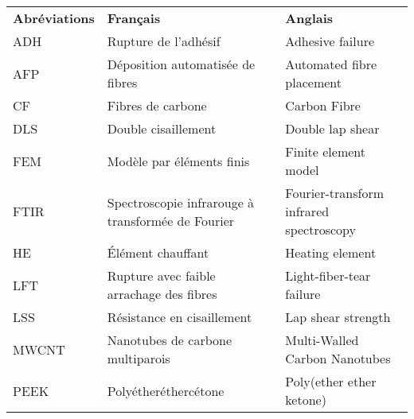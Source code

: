 \begin{longtable}{p{1in}>{\raggedright\arraybackslash}p{2.5in} p{2.45in}}
	\textbf{Abréviations} & \textbf{Français}                                                     & \textbf{Anglais}                                                         \\
	ADH                   & Rupture de l'adhésif                                                  & Adhesive failure                                                         \\
	AFP                   & Déposition automatisée de fibres                                      & Automated fibre placement                                                \\
	CF                    & Fibres de carbone                                                     & Carbon Fibre                                                             \\
	DLS                   & Double cisaillement                                                   & Double lap shear                                                         \\
	FEM                   & Modèle par éléments finis                                             & Finite element model                                                     \\
	FTIR                  & Spectroscopie infrarouge à transformée de Fourier                     & Fourier-transform infrared spectroscopy                                  \\
	HE                    & Élément chauffant                                                     & Heating element                                                          \\
	LFT                   & Rupture avec faible arrachage des fibres                              & Light-fiber-tear failure                                                 \\
	LSS                   & Résistance en cisaillement                                            & Lap shear strength                                                       \\
	MWCNT                 & Nanotubes de carbone multiparois                                      & Multi-Walled Carbon Nanotubes                                            \\
	PEEK                  & Polyétheréthercétone                                                  & Poly(ether ether ketone)                                                 \\

\end{longtable}
